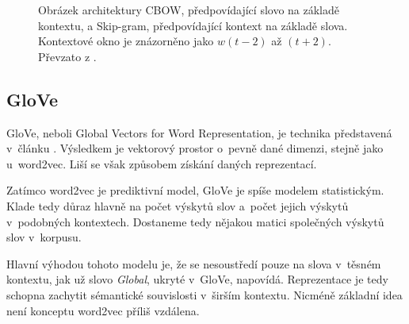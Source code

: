 \begin{figure}[hbt]
	\centering
	\caption{Obrázek architektury CBOW, předpovídající slovo na základě kontextu, a Skip-gram, předpovídající kontext na základě slova. Kontextové okno je znázorněno jako $w(t-2)$ až $(t+2)$. Převzato z \cite{mikolov2013embeddings}.}
	\label{cbow_and_skipgram}
\end{figure}


\subsection{GloVe}

GloVe, neboli Global Vectors for Word Representation, je technika představená v~článku \cite{GloVe}. Výsledkem je vektorový prostor o~pevně dané dimenzi, stejně jako u~word2vec. Liší se však způsobem získání daných reprezentací.\par Zatímco word2vec je prediktivní model, GloVe je spíše modelem statistickým. Klade tedy důraz hlavně na počet výskytů slov a~počet jejich výskytů v~podobných kontextech. Dostaneme tedy nějakou matici společných výskytů slov v~korpusu.\par
Hlavní výhodou tohoto modelu je, že se nesoustředí pouze na slova v~těsném kontextu, jak už slovo \emph{Global}, ukryté v~GloVe, napovídá. Reprezentace je tedy schopna zachytit sémantické souvislosti v~širším kontextu. Nicméně základní idea není konceptu word2vec příliš vzdálena.


